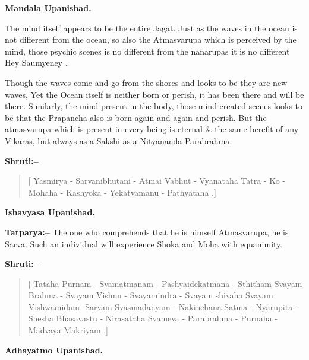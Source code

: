 \begin{flushright}
\textbf{Mandala Upanishad.}
\end{flushright}

The mind itself appears to be the entire Jagat. Just as the waves in the ocean is not different from the ocean, so also the Atmasvarupa which is perceived by the mind, those psychic scenes is no different from the nanarupas it is no different Hey  Saumyeney .

Though the waves come and go from the shores and looks to be they are new waves, Yet the Ocean itself is neither born or perish, it has been there and will be there. Similarly, the mind present in the body, those mind created scenes looks to be that the Prapancha also is born again and again and perish. But the atmasvarupa which is present in every being is eternal \& the same berefit of any Vikaras, but always as a Sakshi as a Nityananda Parabrahma.

\textbf{Shruti:–}

\begin{verse}
[ Yasmirya - Sarvanibhutani - Atmai Vabhut - Vyana\break taha  Tatra - Ko - Mohaha - Kashyoka - Yekatva\break manu - Pathyataha .]
\end{verse}

\begin{flushright}
\textbf{Ishavyasa Upanishad.}
\end{flushright}

\textbf{Tatparya:–} The one who comprehends that he is himself Atmasvarupa, he is Sarva. Such an individual will experience Shoka and Moha with equanimity.

\newpage

\textbf{Shruti:–}

\begin{verse}
[ Tataha Purnam - Svamatmanam - Pashyaidekatmana - Sthitham  Svayam Brahma - Svayam Vishnu - Svayamindra - Svayam shivaha  Svayam Vishwamidam -\break Sarvam Svasmadanyam - Nakinchana  Satma - Nyaru\break pita - Shesha Bhasavastu - Nirasataha  Svameva - Para\break brahma - Purnaha - Madvaya Makriyam .]
\end{verse}

\begin{flushright}
\textbf{Adhayatmo Upanishad.}
\end{flushright}

